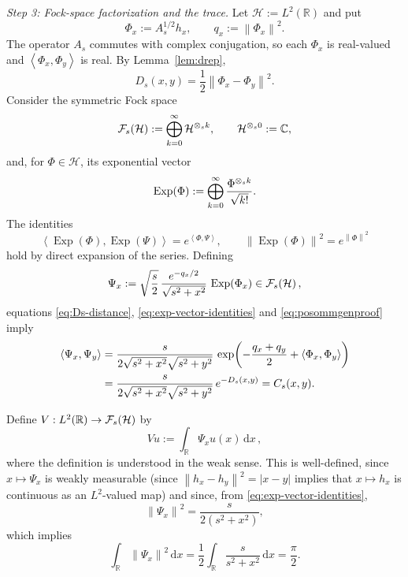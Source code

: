 \documentclass[10pt,a4paper]{amsart}
\newcommand{\R}{\mathbb{R}}
\newcommand{\C}{\mathbb{C}}
\newcommand{\Fock}{\mathcal{F}}
\newcommand{\ip}[2]{\left\langle #1,#2\right\rangle}
\newcommand{\norm}[1]{\left\lVert #1\right\rVert}
\newcommand{\abs}[1]{\left\lvert #1\right\rvert}
\newcommand{\dd}{\,\mathrm{d}}
\begin{document}
\medskip

\emph{Step 3: Fock-space factorization and the trace.}
Let $\mathcal H:=L^2(\R)$ and put
\[
\Phi_x:=A_s^{1/2}h_x,
\qquad
q_x:=\norm{\Phi_x}^2.
\]
The operator $A_s$ commutes with complex conjugation, so each
$\Phi_x$ is real-valued and $\ip{\Phi_x}{\Phi_y}$ is real.  By
Lemma~\ref{lem:drep},
\begin{equation}\label{eq:Ds-distance}
D_s(x,y)=\frac12\norm{\Phi_x-\Phi_y}^2.
\end{equation}
Consider the symmetric Fock space
\[
\Fock_{\rm s}(\mathcal H):=\bigoplus_{k=0}^\infty \mathcal H^{\otimes_{\rm s}k},
\qquad \mathcal H^{\otimes_{\rm s}0}:=\C,
\]
and, for $\Phi\in \mathcal H$, its exponential vector
\[
\operatorname{Exp}(\Phi)
:=\bigoplus_{k=0}^\infty\frac{\Phi^{\otimes_{\rm s}k}}{\sqrt{k!}}.
\]
The identities
\begin{equation}\label{eq:exp-vector-identities}
\ip{\operatorname{Exp}(\Phi)}{\operatorname{Exp}(\Psi)}
=e^{\ip{\Phi}{\Psi}},
\qquad
\norm{\operatorname{Exp}(\Phi)}^2=e^{\norm{\Phi}^2}
\end{equation}
hold by direct expansion of the series. Defining
\begin{equation}\label{eq:Psi-x}
\Psi_x:=\sqrt{\frac{s}{2}}\,
\frac{e^{-q_x/2}}{\sqrt{s^2+x^2}}\,
\operatorname{Exp}(\Phi_x)
\in\Fock_{\rm s}(\mathcal H) \,,
\end{equation}
equations \eqref{eq:Ds-distance},
\eqref{eq:exp-vector-identities} and \eqref{eq:posommgenproof} imply
\begin{align}
\ip{\Psi_x}{\Psi_y}
&=\frac{s}{2\sqrt{s^2+x^2}\sqrt{s^2+y^2}} \,
\exp\!\left(-\frac{q_x+q_y}{2}+\ip{\Phi_x}{\Phi_y}\right)\notag\\
&=\frac{s}{2\sqrt{s^2+x^2}\sqrt{s^2+y^2}} \,e^{-D_s(x,y)}
=C_s(x,y).
\label{eq:Cs-Gram}
\end{align}

Define $V:L^2(\R)\to\Fock_{\rm s}(\mathcal H)$ by
\[
Vu:=\int_{\R}\Psi_xu(x)\dd x \,,
\]
where the definition is understood in the weak sense. This is well-defined, since $x\mapsto\Psi_x$ is weakly measurable (since $\norm{h_x-h_y}^2=\abs{x-y}$ implies that $x\mapsto h_x$ is continuous as an $L^2$-valued map) and since, from
\eqref{eq:exp-vector-identities},
\begin{equation}\label{eq:Psi-norm}
\norm{\Psi_x}^2
=\frac{s}{2(s^2+x^2)},
\end{equation}
which implies
\begin{equation}\label{eq:Psi-L2}
\int_{\R}\norm{\Psi_x}^2\dd x
=\frac12\int_{\R}\frac{s}{s^2+x^2}\dd x
=\frac\pi2.
\end{equation}
\end{document}
